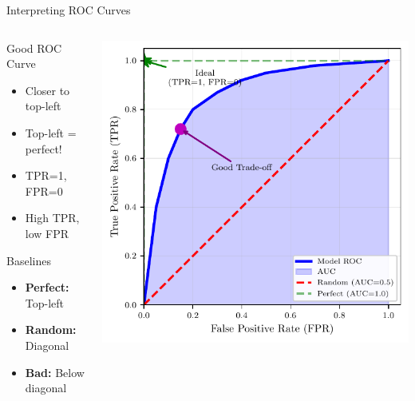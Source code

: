 \documentclass{beamer}
\begin{document}
\begin{frame}{Interpreting ROC Curves}
\begin{columns}
\begin{column}{0.48\textwidth}
\begin{keypointsbox}{Good ROC Curve}
\small
\begin{itemize}
    \item Closer to top-left
    \item Top-left = perfect!
    \item TPR=1, FPR=0
    \item High TPR, low FPR
\end{itemize}
\end{keypointsbox}

\vspace{0.15cm}

\begin{block}{Baselines}
\small
\begin{itemize}
    \item \textbf{Perfect:} Top-left
    \item \textbf{Random:} Diagonal
    \item \textbf{Bad:} Below diagonal
\end{itemize}
\end{block}
\end{column}
\begin{column}{0.48\textwidth}
\includegraphics[width=\textwidth]{roc-curve-diagram.pdf}
\end{column}
\end{columns}
\end{frame}
\end{document}
